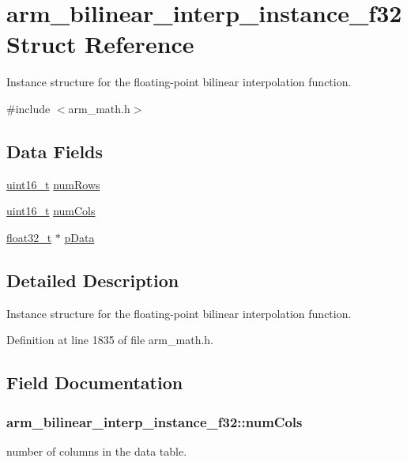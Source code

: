 \hypertarget{structarm__bilinear__interp__instance__f32}{\section{arm\-\_\-bilinear\-\_\-interp\-\_\-instance\-\_\-f32 Struct Reference}
\label{structarm__bilinear__interp__instance__f32}
}


Instance structure for the floating-\/point bilinear interpolation function.  




{\ttfamily \#include $<$arm\-\_\-math.\-h$>$}

\subsection*{Data Fields}
\begin{DoxyCompactItemize}
\item 
\hyperlink{stdint_8h_a273cf69d639a59973b6019625df33e30}{uint16\-\_\-t} \hyperlink{structarm__bilinear__interp__instance__f32_a34f2b17cc57b95011960df9718af6ed6}{num\-Rows}
\item 
\hyperlink{stdint_8h_a273cf69d639a59973b6019625df33e30}{uint16\-\_\-t} \hyperlink{structarm__bilinear__interp__instance__f32_aede17bebfb1f835b61d71dd813eab3f8}{num\-Cols}
\item 
\hyperlink{arm__math_8h_a4611b605e45ab401f02cab15c5e38715}{float32\-\_\-t} $\ast$ \hyperlink{structarm__bilinear__interp__instance__f32_afd1e764591c991c212d56c893efb5ea4}{p\-Data}
\end{DoxyCompactItemize}


\subsection{Detailed Description}
Instance structure for the floating-\/point bilinear interpolation function. 

Definition at line 1835 of file arm\-\_\-math.\-h.



\subsection{Field Documentation}
\hypertarget{structarm__bilinear__interp__instance__f32_aede17bebfb1f835b61d71dd813eab3f8}{
\subsubsection[{num\-Cols}]{ arm\-\_\-bilinear\-\_\-interp\-\_\-instance\-\_\-f32\-::num\-Cols}}\label{structarm__bilinear__interp__instance__f32_aede17bebfb1f835b61d71dd813eab3f8}
number of columns in the data table. 

